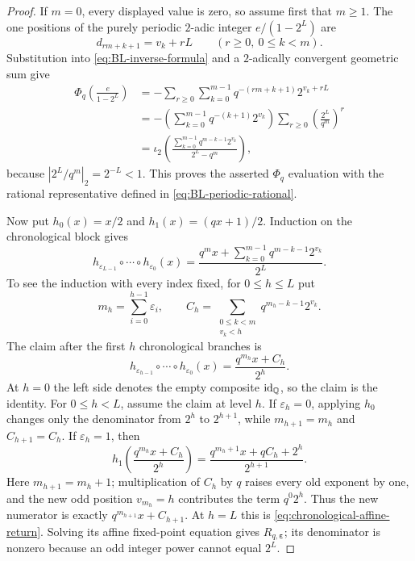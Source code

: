 \begin{proof}
If $m=0$, every displayed value is zero, so assume first that $m\geq1$.
The one positions of the purely periodic $2$-adic integer
$e/(1-2^L)$ are
\[
 d_{rm+k+1}=v_k+rL
 \qquad(r\geq0,\ 0\leq k<m).
\]
Substitution into \cref{eq:BL-inverse-formula} and a $2$-adically
convergent geometric sum give
\begin{align*}
 \Phi_q\!\left(\frac{e}{1-2^L}\right)
 &=-\sum_{r\geq0}\sum_{k=0}^{m-1}
       q^{-(rm+k+1)}2^{v_k+rL}\\
 &=-\left(\sum_{k=0}^{m-1}q^{-(k+1)}2^{v_k}\right)
       \sum_{r\geq0}\left(\frac{2^L}{q^m}\right)^r\\
 &=\iota_2\!\left(\frac{\displaystyle
         \sum_{k=0}^{m-1}q^{m-k-1}2^{v_k}}
        {2^L-q^m}\right),
\end{align*}
because $|2^L/q^m|_2=2^{-L}<1$.  This proves
the asserted $\Phi_q$ evaluation with the rational representative defined in
\cref{eq:BL-periodic-rational}.

Now put $h_0(x)=x/2$ and $h_1(x)=(qx+1)/2$.  Induction on the chronological
block gives
\begin{equation}
\label{eq:chronological-affine-return}
 h_{\varepsilon_{L-1}}\circ\cdots\circ h_{\varepsilon_0}(x)
 =\frac{q^m x+
        \displaystyle\sum_{k=0}^{m-1}q^{m-k-1}2^{v_k}}
       {2^L}.
\end{equation}
To see the induction with every index fixed, for $0\leq h\leq L$ put
\[
 m_h=\sum_{i=0}^{h-1}\varepsilon_i,
 \qquad
 C_h=\sum_{\substack{0\leq k<m\\v_k<h}}
       q^{m_h-k-1}2^{v_k}.
\]
The claim after the first $h$ chronological branches is
\[
 h_{\varepsilon_{h-1}}\circ\cdots\circ h_{\varepsilon_0}(x)
 =\frac{q^{m_h}x+C_h}{2^h}.
\]
At $h=0$ the left side denotes the empty composite
$\operatorname{id}_{\mathbb Q}$, so the claim is the identity.  For
$0\leq h<L$, assume the claim at level $h$.  If $\varepsilon_h=0$, applying
$h_0$ changes
only the denominator from $2^h$ to $2^{h+1}$, while
$m_{h+1}=m_h$ and $C_{h+1}=C_h$.  If $\varepsilon_h=1$, then
\[
 h_1\!\left(\frac{q^{m_h}x+C_h}{2^h}\right)
 =\frac{q^{m_h+1}x+qC_h+2^h}{2^{h+1}}.
\]
Here $m_{h+1}=m_h+1$; multiplication of $C_h$ by $q$ raises every old
exponent by one, and the new odd position $v_{m_h}=h$ contributes the term
$q^0 2^h$.  Thus the new numerator is exactly $q^{m_{h+1}}x+C_{h+1}$.
At $h=L$ this is \cref{eq:chronological-affine-return}.  Solving its affine
fixed-point equation gives $R_{q,\boldsymbol\varepsilon}$; its denominator is
nonzero because an odd
integer power cannot equal $2^L$.


\end{proof}
